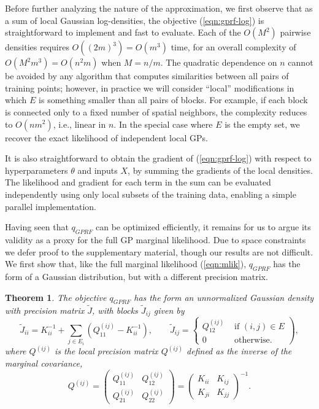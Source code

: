\documentclass{article}
\newtheorem{theorem}{Theorem}
\begin{document}
Before further analyzing the nature of the approximation, we first
observe that as a sum of local Gaussian log-densities, the objective (\ref{eqn:gprf-log})
is straightforward to implement and fast to evaluate. Each of the $O(M^2)$
pairwise densities requires $O((2m)^3) = O(m^3)$ time, for an overall complexity of
$O(M^2m^3) = O(n^2m)$ when $M=n/m$. The quadratic dependence on $n$ cannot
be avoided by any algorithm that computes similarities between all
pairs of training points; however, in practice we will consider ``local''
modifications in which $E$ is something smaller than all
pairs of blocks. For example, if each block is connected only to a
fixed number of spatial neighbors, the complexity reduces
to $O(nm^2)$, i.e., linear in $n$. In the special case where $E$ is
the empty set, we recover the exact likelihood of independent local GPs.

It is also straightforward to obtain the gradient of
(\ref{eqn:gprf-log}) with respect to hyperparameters $\theta$ and inputs $X$, by summing
the gradients of the local densities. The likelihood and gradient for each term in the sum
can be evaluated independently using only local subsets of the
training data, enabling a simple parallel implementation. 

Having seen that $q_{GPRF}$ can be optimized efficiently, it remains
for us to argue its validity as a proxy for the full GP marginal
likelihood. Due to space constraints we
defer proof to the supplementary material, though our results are not
difficult. We first show that, like the full marginal likelihood (\ref{eqn:mlik}),
$q_{GPRF}$ has the form of a Gaussian distribution, but with a
different precision matrix.

\begin{theorem}
The objective $q_{GPRF}$ has the form an unnormalized Gaussian density
with precision matrix $\tilde{J}$, with blocks $\tilde{J}_{ij}$ given by
\begin{equation}
\tilde{J}_{ii} = K_{ii}^{-1} + \sum_{j\in E_i} \left(Q^{(ij)}_{11}
    - K_{ii}^{-1}\right), \qquad \tilde{J}_{ij} =
  \left\{\begin{array}{ll}Q^{(ij)}_{12} & \text{ if } (i,j) \in E\\0
    & \text{ otherwise.}\end{array}\right),\label{eqn:approx-precision}
\end{equation}
where  $Q^{(ij)}$ is the {\em local precision  matrix} $Q^{(ij)}$
defined as the inverse of the marginal covariance,
\[Q^{(ij)} = \left(\begin{array}{cc} Q^{(ij)}_{11} &  Q^{(ij)}_{12}\\
  Q^{(ij)}_{21}  & Q^{(ij)}_{22}\end{array}\right) = \left(\begin{array}{cc} K_{ii} &  K_{ij}\\
  K_{ji}  & K_{jj}\end{array}\right)^{-1}.\]
\end{theorem}
\end{document}
